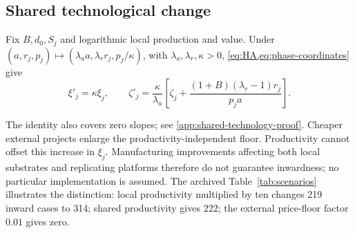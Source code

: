 \begin{samepage}
\subsection{Shared technological change}
\begin{corollary}
\label{cor:shared-technology}
Fix $B,d_0,S_j$ and logarithmic local production and value. Under
$(a,r_j,p_j)\mapsto(\lambda_a a,\lambda_r r_j,p_j/\kappa)$, with
$\lambda_a,\lambda_r,\kappa>0$, \cref{eq:HA,eq:phase-coordinates} give
\begin{equation}
 \xi'_j=\kappa\xi_j,\qquad
 \zeta'_j=\frac{\kappa}{\lambda_a}
 \left[\zeta_j+\frac{(1+B)(\lambda_r-1)r_j}{p_ja}\right].
 \label{eq:shared-technology}
\end{equation}
\end{corollary}
\end{samepage}
The identity also covers zero slopes; see \cref{app:shared-technology-proof}.
Cheaper external projects enlarge the productivity-independent floor.
Productivity cannot offset this increase in $\xi_j$.
Manufacturing improvements affecting both local substrates and replicating
platforms therefore do not guarantee inwardness; no particular implementation
is assumed. The archived Table~\ref{tab:scenarios} illustrates the distinction:
local productivity multiplied by ten changes 219 inward cases to 314;
shared productivity gives 222; the external price-floor factor $0.01$ gives zero.
